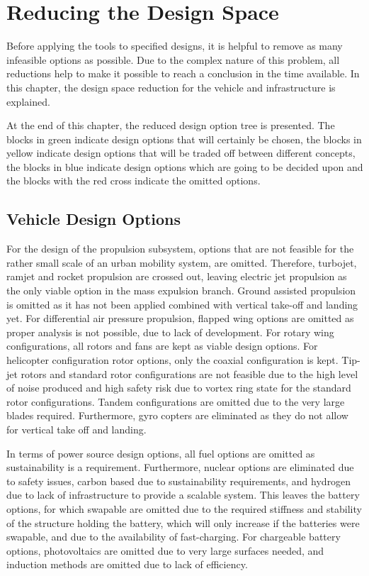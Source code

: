 \newpage
\chapter{Reducing the Design Space}
\label{ch-DS}

Before applying the tools to specified designs, it is helpful to remove as many infeasible options as possible. Due to the complex nature of this problem, all reductions help to make it possible to reach a conclusion in the time available. In this chapter, the design space reduction for the vehicle and infrastructure is explained.

At the end of this chapter, the reduced design option tree is presented. The blocks in green indicate design options that will certainly be chosen, the blocks in yellow indicate design options that will be traded off between different concepts, the blocks in blue indicate design options which are going to be decided upon and the blocks with the red cross indicate the omitted options.

\section{Vehicle Design Options}
\label{VehDesignOptions}
For the design of the propulsion subsystem, options that are not feasible for the rather small scale of an urban mobility system, are omitted. Therefore, turbojet, ramjet and rocket propulsion are crossed out, leaving electric jet propulsion as the only viable option in the mass expulsion branch. Ground assisted propulsion is omitted as it has not been applied combined with vertical take-off and landing yet. For differential air pressure propulsion, flapped wing options are omitted as proper analysis is not possible, due to lack of development. For rotary wing configurations, all rotors and fans are kept as viable design options. For helicopter configuration rotor options, only the coaxial configuration is kept. Tip-jet rotors and standard rotor configurations are not feasible due to the high level of noise produced and high safety risk due to vortex ring state for the standard rotor configurations. Tandem configurations are omitted due to the very large blades required. Furthermore, gyro copters are eliminated as they do not allow for vertical take off and landing. 

In terms of power source design options, all fuel options are omitted as sustainability is a requirement. Furthermore, nuclear options are eliminated due to safety issues, carbon based due to sustainability requirements, and hydrogen due to lack of infrastructure to provide a scalable system. This leaves the battery options, for which swapable are omitted due to the required stiffness and stability of the structure holding the battery, which will only increase if the batteries were swapable, and due to the availability of fast-charging. For chargeable battery options, photovoltaics are omitted due to very large surfaces needed, and induction methods are omitted due to lack of efficiency.

